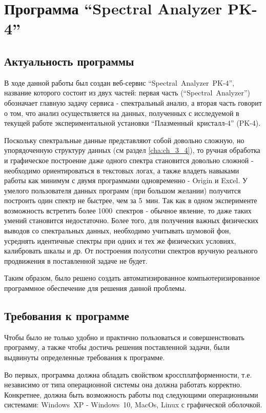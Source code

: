 \chapter{Программа “Spectral Analyzer PK-4”}
\label{cha:ch_4}
\section{Актуальность программы}
В ходе данной работы был создан веб-сервис “Spectral~Analyzer~PK-4”, название которого состоит из двух частей:
первая часть (“Spectral~Analyzer”) обозначает главную задачу сервиса - спектральный анализ, а вторая часть говорит
о том, что анализ осуществляется на данных, полученных с исследуемой в текущей работе экспериментальной установки
“Плазменный~кристалл-4” (PK-4).

Поскольку спектральные данные представляют собой довольно сложную, но упорядоченную структуру данных
(см раздел \ref{cha:ch_3_4}), то ручная обработка и графическое построение даже одного спектра становится
довольно сложной - необходимо ориентироваться в текстовых логах, а также владеть навыками работы
как минимум с двумя программами одновременно - Origin и Exсel. У умелого пользователя данных программ
(при большом желании) получится построить один спектр не быстрее, чем за 5~мин. Так как в одном эксперименте
возможность встретить более 1000~спектров - обычное явление, то даже таких умений становится недостаточно.
Более того, для получения важных физических выводов со спектральных данных, необходимо учитывать шумовой фон,
усреднять идентичные спектры при одних и тех же физических условиях, калибровать шкалы  и др.
От построения полусотни спектров вручную реального продвижения в поставленной задаче не будет.

Таким образом, было решено создать автоматизированное компьютеризированное программное обеспечение для решения данной проблемы.

\section{Требования к программе}
Чтобы было не только удобно и практично пользоваться и совершенствовать программу,
а также чтобы достичь решения поставленной задачи, были выдвинуты определенные требования к программе.

Во первых, программа должна обладать свойством кроссплатформенности, т.е. независимо от типа операционной
системы она должна работать корректно. Конкретнее, должна быть возможность работы под следующими операционными
системами: Windows~XP - Windows~10, MacOs, Linux с графической оболочкой.

